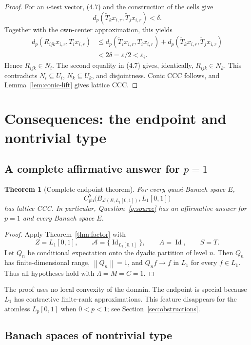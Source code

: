 \documentclass[11pt]{article}
\newtheorem{theorem}{Theorem}[section]
\theoremstyle{definition}
\newcommand{\Lone}{L_1[0,1]}
\newcommand{\cph}{C_{\mathrm{ph}}^b}
\newcommand{\calL}{\mathcal L}
\newcommand{\calA}{\mathcal A}
\newcommand{\id}{\operatorname{Id}}
\newcommand{\norm}[1]{\left\lVert #1\right\rVert}
\begin{document}
\begin{proof}
For an $i$-test vector, (4.7) and the construction of the cells give
\[
 d_p(\widetilde T_kx_{i,r},\widetilde T_jx_{i,r})<\delta.
\]
Together with the own-center approximation, this yields
\[
 \begin{aligned}
 d_p(R_{ijk}x_{i,r},T_ix_{i,r})
 &\leq d_p(\widetilde T_ix_{i,r},T_ix_{i,r})
     +d_p(\widetilde T_kx_{i,r},\widetilde T_jx_{i,r})\\
 &<2\delta=\varepsilon/2<\varepsilon_i.
 \end{aligned}
\]
Hence $R_{ijk}\in N_i$.  The second equality in (4.7) gives, identically,
$R_{ijk}\in N_k$.  This contradicts $N_i\subseteq U_i$, $N_k\subseteq U_k$,
and disjointness.  Conic CCC follows, and Lemma~\ref{lem:conic-lift} gives
lattice CCC.
\end{proof}

\section{Consequences: the endpoint and nontrivial type}

\subsection{A complete affirmative answer for $p=1$}

\begin{theorem}[Complete endpoint theorem]
\label{thm:p1}
For every quasi-Banach space $E$,
\[
 \cph\bigl(B_{\calL(E,\Lone)},\Lone\bigr)
\]
has lattice CCC.  In particular, Question~\ref{q:source} has an affirmative
answer for $p=1$ and every Banach space $E$.
\end{theorem}

\begin{proof}
Apply Theorem~\ref{thm:factor} with
\[
 Z=\Lone,\qquad \calA=\{\id_{\Lone}\},\qquad A=\id,
 \qquad S=T.
\]
Let $Q_n$ be conditional expectation onto the dyadic partition of level $n$.
Then $Q_n$ has finite-dimensional range, $\norm{Q_n}=1$, and $Q_nf\to f$ in
$L_1$ for every $f\in L_1$.  Thus all hypotheses hold with
$\Lambda=M=C=1$.
\end{proof}

The proof uses no local convexity of the domain.  The endpoint is special because
$L_1$ has contractive finite-rank approximations.  This feature disappears for
the atomless $L_p[0,1]$ when $0<p<1$; see Section~\ref{sec:obstructions}.

\subsection{Banach spaces of nontrivial type}
\end{document}
